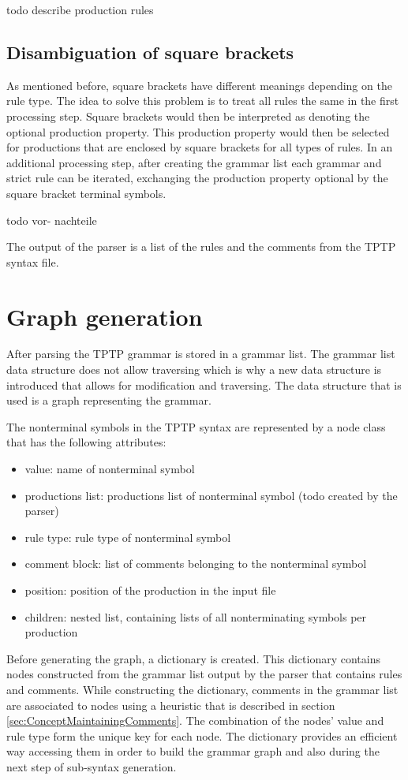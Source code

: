 todo describe production rules

\subsection{Disambiguation of  square brackets}
As mentioned before, square brackets have different meanings depending on the rule type.
The idea to solve this problem is to treat all rules the same in the first processing step.
Square brackets would then be interpreted as denoting the optional production property.
This production property would then be selected for productions that are enclosed by square brackets for all types of rules.
In an additional processing step, after creating the grammar list each grammar and strict rule can be iterated, exchanging the production property optional by the square bracket terminal symbols.

todo vor- nachteile


The output of the parser is a list of the rules and the comments from the \ac{TPTP} syntax file.
\section{Graph generation}\label{sec:ConceptGraphGeneration}
After parsing the TPTP grammar is stored in a grammar list. The grammar list data structure does not allow traversing which is why a new data structure is introduced that allows for modification and traversing.
The data structure that is used is a graph representing the grammar.

The nonterminal symbols in the TPTP syntax are represented by a node class that has the following attributes:
\begin{itemize}
\item value: name of nonterminal symbol
\item productions list: productions list of nonterminal symbol (todo created by the parser)
\item rule type: rule type of nonterminal symbol
\item comment block: list of comments belonging to the nonterminal symbol
\item position: position of the production in the input file
\item children: nested list, containing lists of all nonterminating symbols per production
\end{itemize}

Before generating the graph, a dictionary is created.
This dictionary contains nodes constructed from the grammar list output by the parser that contains rules and comments.
While constructing the dictionary, comments in the grammar list are associated to nodes using a heuristic that is described in section \ref{sec:ConceptMaintainingComments}.
The combination of the nodes' value and rule type form the unique key for each node.
The dictionary provides an efficient way accessing them in order to build the grammar graph and also during the next step of sub-syntax generation.

